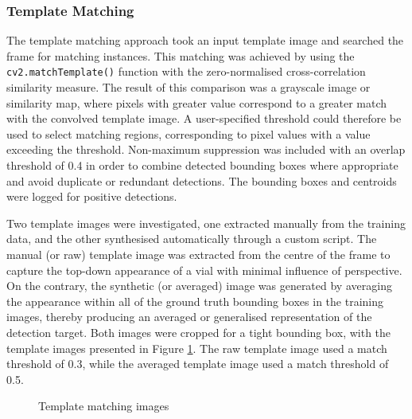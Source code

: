 \documentclass[10pt]{article}
\begin{document}
\subsubsection{Template Matching}
The template matching approach took an input template image and searched the frame for matching instances. This matching was achieved by using the \texttt{cv2.matchTemplate()} function with the zero-normalised cross-correlation similarity measure. The result of this comparison was a grayscale image or similarity map, where pixels with greater value correspond to a greater match with the convolved template image. A user-specified threshold could therefore be used to select matching regions, corresponding to pixel values with a value exceeding the threshold. Non-maximum suppression was included with an overlap threshold of 0.4 in order to combine detected bounding boxes where appropriate and avoid duplicate or redundant detections. The bounding boxes and centroids were logged for positive detections.

Two template images were investigated, one extracted manually from the training data, and the other synthesised automatically through a custom script. The manual (or raw) template image was extracted from the centre of the frame to capture the top-down appearance of a vial with minimal influence of perspective. On the contrary, the synthetic (or averaged) image was generated by averaging the appearance within all of the ground truth bounding boxes in the training images, thereby producing an averaged or generalised representation of the detection target. Both images were cropped for a tight bounding box, with the template images presented in Figure \ref{fig:template_images}. The raw template image used a match threshold of 0.3, while the averaged template image used a match threshold of 0.5.

\vfill
\begin{figure}[hbt]%
    \centering
    \qquad %
    \caption{Template matching images}
    \label{fig:template_images}%
\end{figure}
\vfill
\end{document}
